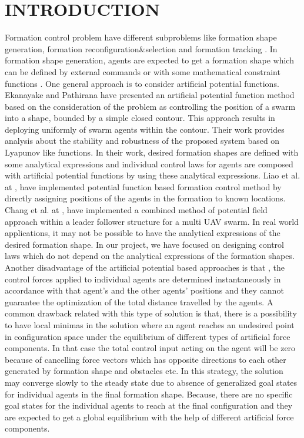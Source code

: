 \documentclass[letterpaper, 10 pt, conference]{ieeeconf}  %
\begin{document}
\section{INTRODUCTION}
Formation control problem have different subproblems like formation shape generation, formation reconfiguration$\&$selection and formation tracking \cite{12}.  
In formation shape generation, agents are expected to get a formation shape which can be defined by external commands or with some mathematical constraint functions \cite{16}.  One general approach is to consider artificial potential functions. Ekanayake and Pathirana \cite{17} have presented an artificial potential function method  based on the consideration of the problem as controlling the position of a swarm into a shape, bounded by a simple closed contour. This approach results in deploying uniformly of swarm agents within the contour.  Their work provides analysis about the stability and robustness of the proposed system based on Lyapunov like functions. In their work, desired formation shapes are defined with some analytical expressions and individual control laws for agents are composed with artificial potential functions by using these analytical expressions. Liao et al. at \cite{504}, have implemented potential function based formation control method by directly assigning positions of the agents in the formation to known locations. Chang et al. at \cite{505}, have implemented a combined method of potential field approach within a leader follower structure for a multi UAV swarm. In real world applications, it may not be possible to have the analytical expressions of the desired formation shape. In our project, we have focused on designing control laws which do not depend on the analytical expressions of the formation shapes. Another disadvantage of the artificial potential based approaches is that , the control forces applied to individual agents are determined instantaneously in accordance with that agent's and the other agents' positions and they cannot guarantee the optimization of the total distance travelled by the agents. A common drawback related with this type of solution is that, there is a possibility to have local minimas in the solution where an agent reaches an undesired point in configuration space under the equilibrium of different types of artificial force components. In that case the total control input acting on the agent will be zero because of cancelling force vectors which has opposite directions to each other generated by formation shape and obstacles etc. In this strategy, the solution may converge slowly to the steady state due to absence of generalized goal states for individual agents in the final formation shape. Because, there are no specific goal states for the individual agents to reach at the final configuration and they are expected to get a global equilibrium with the help of different artificial force components. 
\end{document}
